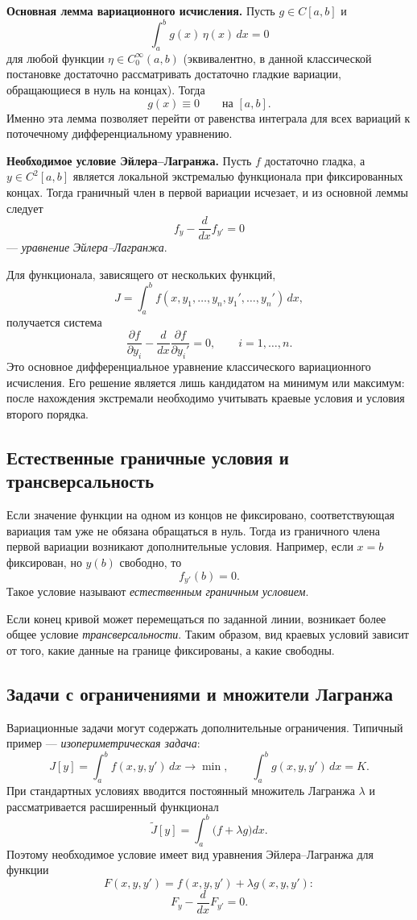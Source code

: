 \textbf{Основная лемма вариационного исчисления.}
Пусть $g\in C[a,b]$ и
\[
    \int_a^b g(x)\,\eta(x)\,dx=0
\]
для любой функции $\eta\in C_0^\infty(a,b)$ (эквивалентно, в данной
классической постановке достаточно рассматривать достаточно гладкие вариации,
обращающиеся в нуль на концах). Тогда
\[
    g(x)\equiv0\qquad \text{на }[a,b].
\]
Именно эта лемма позволяет перейти от равенства интеграла для всех вариаций к
поточечному дифференциальному уравнению.

\textbf{Необходимое условие Эйлера--Лагранжа.}
Пусть $f$ достаточно гладка, а $y\in C^2[a,b]$ является локальной экстремалью
функционала при фиксированных концах. Тогда граничный член в первой вариации
исчезает, и из основной леммы следует
\[
    \boxed{\quad
    f_y-\frac{d}{dx}f_{y'}=0
    \quad}
\]
--- \emph{уравнение Эйлера--Лагранжа}.

Для функционала, зависящего от нескольких функций,
\[
    J=\int_a^b
    f(x,y_1,\ldots,y_n,y_1',\ldots,y_n')\,dx,
\]
получается система
\[
    \frac{\partial f}{\partial y_i}
    -\frac{d}{dx}\frac{\partial f}{\partial y_i'}=0,
    \qquad i=1,\ldots,n.
\]
Это основное дифференциальное уравнение классического вариационного исчисления.
Его решение является лишь кандидатом на минимум или максимум: после нахождения
экстремали необходимо учитывать краевые условия и условия второго порядка.


\subsection{Естественные граничные условия и трансверсальность}

Если значение функции на одном из концов не фиксировано, соответствующая
вариация там уже не обязана обращаться в нуль. Тогда из граничного члена первой
вариации возникают дополнительные условия. Например, если $x=b$ фиксирован,
но $y(b)$ свободно, то
\[
    f_{y'}(b)=0.
\]
Такое условие называют \emph{естественным граничным условием}.

Если конец кривой может перемещаться по заданной линии, возникает более общее
условие \emph{трансверсальности}. Таким образом, вид краевых условий зависит от
того, какие данные на границе фиксированы, а какие свободны.

\subsection{Задачи с ограничениями и множители Лагранжа}

Вариационные задачи могут содержать дополнительные ограничения. Типичный пример
--- \emph{изопериметрическая задача}:
\[
    J[y]=\int_a^b f(x,y,y')\,dx\to\min,
    \qquad
    \int_a^b g(x,y,y')\,dx=K.
\]
При стандартных условиях вводится постоянный множитель Лагранжа $\lambda$ и
рассматривается расширенный функционал
\[
    \widetilde J[y]
    =\int_a^b\bigl(f+\lambda g\bigr)dx.
\]
Поэтому необходимое условие имеет вид уравнения Эйлера--Лагранжа для функции
\[
    F(x,y,y')=f(x,y,y')+\lambda g(x,y,y'):
\]
\[
    F_y-\frac{d}{dx}F_{y'}=0.
\]

